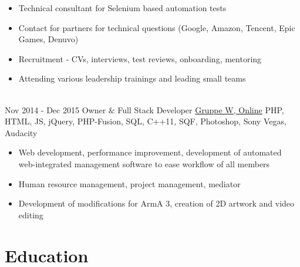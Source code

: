 \documentclass[letterpaper]{twentysecondcv} %
\begin{document}
\begin{twenty}
{\begin{itemize}
        			\begin{itemize}
        				\item command-line tool to upload games
        				\item revamping the patching system (based on \textit{FastCDC})
        				\item integrating a new progressive download technology
        				\item tools for savegame management and migration
        			\end{itemize}
        			\item Technical consultant for Selenium based automation tests
        			\item Contact for partners for technical questions (Google, Amazon, Tencent, Epic Games, Denuvo)
        			\item Recruitment - CVs, interviews, test reviews, onboarding, mentoring
        			\item Attending various leadership trainings and leading small teams
        		\end{itemize}}\\
	\twentyitem
    		{Nov 2014 -}
		{Dec 2015}
        		{Owner \& Full Stack Developer}
        		{\href{https://www.gruppe-w.de/}{Gruppe W, Online}}
        		{PHP, HTML, JS, jQuery, PHP-Fusion, SQL, C++11, SQF, Photoshop, Sony Vegas, Audacity}
        		{\begin{itemize}
        			\item Web development, performance improvement, development of automated web-integrated
        				management software to ease workflow of all members
			\item Human resource management, project management, mediator
        			\item Development of modifications for ArmA 3, creation of 2D artwork and video editing
        		\end{itemize}}
\end{twenty}

\newpage

\makesidebarSecond %

\section{Education}
\end{document}
